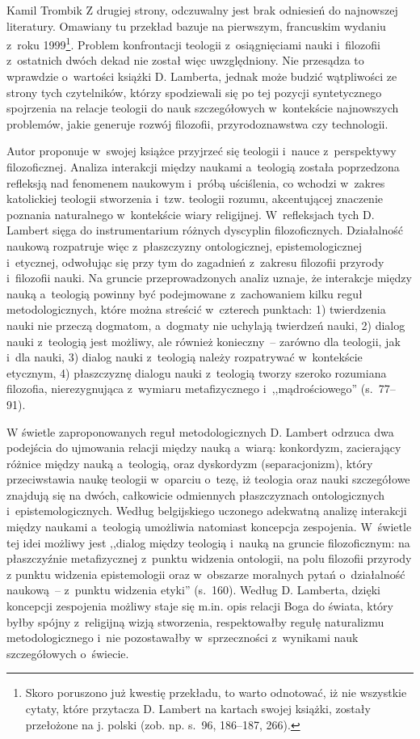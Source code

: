 \begin{recplenv}{Kamil Trombik}
Z drugiej strony, odczuwalny jest brak odniesień do najnowszej literatury. Omawiany tu przekład bazuje na pierwszym,
francuskim wydaniu z~roku 1999\footnote{Skoro poruszono już kwestię przekładu, to warto odnotować, iż nie wszystkie
cytaty, które przytacza D. Lambert na kartach swojej książki, zostały przełożone na j. polski (zob. np. s.~96, 186--187,
266). }. Problem konfrontacji teologii z~osiągnięciami nauki i~filozofii z~ostatnich dwóch dekad nie został więc
uwzględniony. Nie przesądza to wprawdzie o~wartości książki D. Lamberta, jednak może budzić wątpliwości ze strony tych
czytelników, którzy spodziewali się po tej pozycji syntetycznego spojrzenia na relacje teologii do nauk
szczegółowych w~kontekście najnowszych problemów, jakie generuje rozwój filozofii, przyrodoznawstwa czy technologii. 

Autor proponuje w~swojej książce przyjrzeć się teologii i~nauce z~perspektywy filozoficznej. Analiza interakcji między
naukami a~teologią została poprzedzona refleksją nad fenomenem naukowym i~próbą uściślenia, co wchodzi w~zakres
katolickiej teologii stworzenia i~tzw. teologii rozumu, akcentującej znaczenie poznania naturalnego w~kontekście wiary
religijnej. W~refleksjach tych D. Lambert sięga do instrumentarium różnych dyscyplin filozoficznych. Działalność
naukową rozpatruje więc z~płaszczyzny ontologicznej, epistemologicznej i~etycznej, odwołując się przy tym do
zagadnień z~zakresu filozofii przyrody i~filozofii nauki. Na gruncie przeprowadzonych analiz uznaje, że interakcje między
nauką a~teologią powinny być podejmowane z~zachowaniem kilku reguł metodologicznych, które można streścić w~czterech punktach:
1) twierdzenia nauki nie przeczą dogmatom, a~dogmaty nie uchylają twierdzeń nauki, 2) dialog nauki z~teologią jest
możliwy, ale również konieczny~-- zarówno dla teologii, jak i~dla nauki, 3) dialog nauki z~teologią należy
rozpatrywać w~kontekście etycznym, 4) płaszczyznę dialogu nauki z~teologią tworzy szeroko rozumiana filozofia,
nierezygnująca z~wymiaru metafizycznego i~,,mądrościowego'' (s.~77–91).

W świetle zaproponowanych reguł metodologicznych D. Lambert odrzuca dwa podejścia do ujmowania relacji między
nauką a~wiarą: konkordyzm, zacierający różnice między nauką a~teologią, oraz dyskordyzm (separacjonizm), który przeciwstawia
naukę teologii w~oparciu o~tezę, iż teologia oraz nauki szczegółowe znajdują się na dwóch, całkowicie odmiennych
płaszczyznach ontologicznych i~epistemologicznych. Według belgijskiego uczonego adekwatną analizę interakcji między
naukami a~teologią umożliwia natomiast koncepcja zespojenia. W~świetle tej idei możliwy jest ,,dialog między
teologią i~nauką na gruncie filozoficznym: na płaszczyźnie metafizycznej z~punktu widzenia ontologii, na polu filozofii przyrody z
punktu widzenia epistemologii oraz w~obszarze moralnych pytań o~działalność naukową~-- z~punktu widzenia etyki''
(s.~160). Według D. Lamberta, dzięki koncepcji zespojenia możliwy staje się m.in. opis relacji Boga do świata, który byłby
spójny z~religijną wizją stworzenia, respektowałby regułę naturalizmu metodologicznego i~nie
pozostawałby w~sprzeczności z~wynikami nauk szczegółowych o~świecie. 


\end{recplenv}
